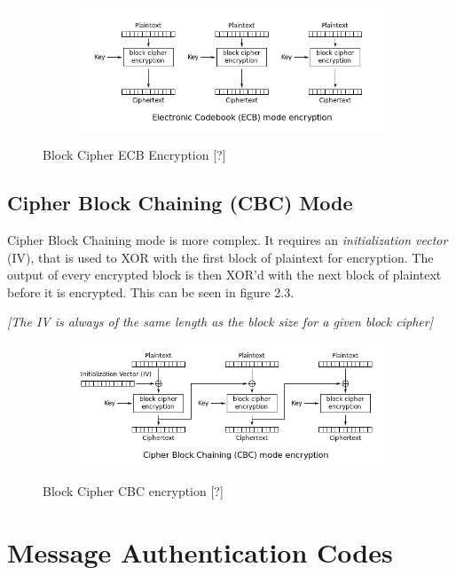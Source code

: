 \documentclass[bsc,frontabs,twoside,singlespacing,parskip,deptreport]{infthesis}     %
\begin{document}
\begin{figure}[H]
\centering
\begin{subfigure}{1.0\textwidth}
  \includegraphics[width=1\linewidth]
  {images/crypto/ecb.png}
\end{subfigure}
\caption{Block Cipher ECB Encryption [?]}
\end{figure}
\subsection{Cipher Block Chaining (CBC) Mode}

Cipher Block Chaining mode is more complex. It requires an \textit{initialization vector} (IV), that is used to XOR with the first block of plaintext for encryption. The output of every encrypted block is then XOR'd with the next block of plaintext before it is encrypted. This can be seen in figure 2.3.

\textit{[The IV is always of the same length as the block size for a given block cipher]}

\begin{figure}[H]
\centering
\begin{subfigure}{1.0\textwidth}
  \includegraphics[width=1\linewidth]
  {images/crypto/cbc.png}
\end{subfigure}
\caption{Block Cipher CBC encryption [?]}
\end{figure}

\section{Message Authentication Codes}
\end{document}
